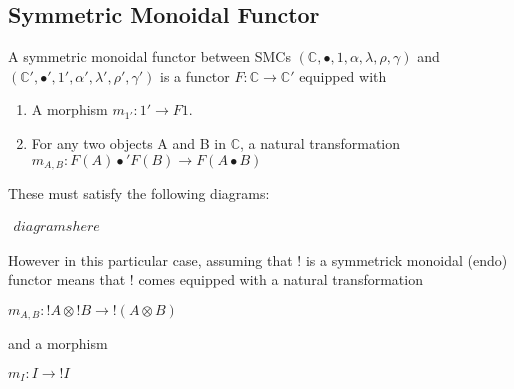 \subsection{Symmetric Monoidal Functor}
\label{subsec:symmetric_monoidal_functor}
\begin{definition}
    A symmetric monoidal functor between SMCs $(\mathbb{C},\bullet,1,\alpha,\lambda,\rho,\gamma)$ and 
    $(\mathbb{C}',\bullet',1',\alpha',\lambda',\rho',\gamma')$ is a functor $F:\mathbb{C} \rightarrow \mathbb{C}'$
    equipped with
    \begin{enumerate}
        \item A morphism $m_{1'}: 1' \rightarrow F1$.
        \item For any two objects A and B in $\mathbb{C}$, a natural transformation $m_{A,B}:F(A) \bullet 'F(B) \rightarrow F(A \bullet B)$
    \end{enumerate}
    These must satisfy the following diagrams:
    \begin{center}
        \begin{math}
            \begin{array}{c}
                diagrams here
            \end{array}
        \end{math}
    \end{center}
    However in this particular case, assuming that ! is a symmetrick monoidal (endo) functor means that ! comes equipped
    with a natural transformation
    \begin{center}
        \begin{math}
            m_{A,B}:!A \otimes !B \rightarrow !(A \otimes B)
        \end{math}
    \end{center}
    and a morphism
    \begin{center}
        \begin{math}
            m_I : I \rightarrow !I
        \end{math}
    \end{center}
\end{definition}